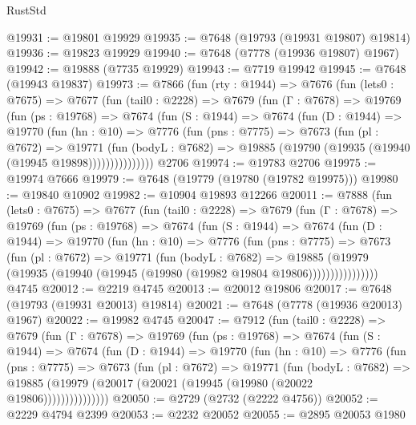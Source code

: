 \begin{lexlean}{RustStd}
\begin{coremodule}
@19931 := @19801 @19929
@19935 := @7648 (@19793 (@19931 @19807) @19814)
@19936 := @19823 @19929
@19940 := @7648 (@7778 (@19936 @19807) @1967)
@19942 := @19888 (@7735 @19929)
@19943 := @7719 @19942
@19945 := @7648 (@19943 @19837)
@19973 := @7866
    (fun (rty : @1944) =>
    @7676
      (fun (lets0 : @7675) =>
      @7677
        (fun (tail0 : @2228) =>
        @7679
          (fun (Γ : @7678) =>
          @19769
            (fun (ps : @19768) =>
            @7674
              (fun (S : @1944) =>
              @7674
                (fun (D : @1944) =>
                @19770
                  (fun (hn : @10) =>
                  @7776
                    (fun (pns : @7775) =>
                    @7673
                      (fun (pl : @7672) =>
                      @19771
                        (fun (bodyL : @7682) =>
                        @19885 (@19790 (@19935 (@19940 (@19945 @19898)))))))))))))))
    @2706
@19974 := @19783 @2706
@19975 := @19974 @7666
@19979 := @7648 (@19779 (@19780 (@19782 @19975)))
@19980 := @19840 @10902
@19982 := @10904 @19893 @12266
@20011 := @7888
    (fun (lets0 : @7675) =>
    @7677
      (fun (tail0 : @2228) =>
      @7679
        (fun (Γ : @7678) =>
        @19769
          (fun (ps : @19768) =>
          @7674
            (fun (S : @1944) =>
            @7674
              (fun (D : @1944) =>
              @19770
                (fun (hn : @10) =>
                @7776
                  (fun (pns : @7775) =>
                  @7673
                    (fun (pl : @7672) =>
                    @19771
                      (fun (bodyL : @7682) =>
                      @19885
                        (@19979
                          (@19935 (@19940 (@19945 (@19980 (@19982 @19804 @19806))))))))))))))))
    @4745
@20012 := @2219 @4745
@20013 := @20012 @19806
@20017 := @7648 (@19793 (@19931 @20013) @19814)
@20021 := @7648 (@7778 (@19936 @20013) @1967)
@20022 := @19982 @4745
@20047 := @7912
    (fun (tail0 : @2228) =>
    @7679
      (fun (Γ : @7678) =>
      @19769
        (fun (ps : @19768) =>
        @7674
          (fun (S : @1944) =>
          @7674
            (fun (D : @1944) =>
            @19770
              (fun (hn : @10) =>
              @7776
                (fun (pns : @7775) =>
                @7673
                  (fun (pl : @7672) =>
                  @19771
                    (fun (bodyL : @7682) =>
                    @19885 (@19979 (@20017 (@20021 (@19945 (@19980 (@20022 @19806)))))))))))))))
@20050 := @2729 (@2732 (@2222 @4756))
@20052 := @2229 @4794 @2399
@20053 := @2232 @20052
@20055 := @2895 @20053 @1980

\end{coremodule}
\end{lexlean}
